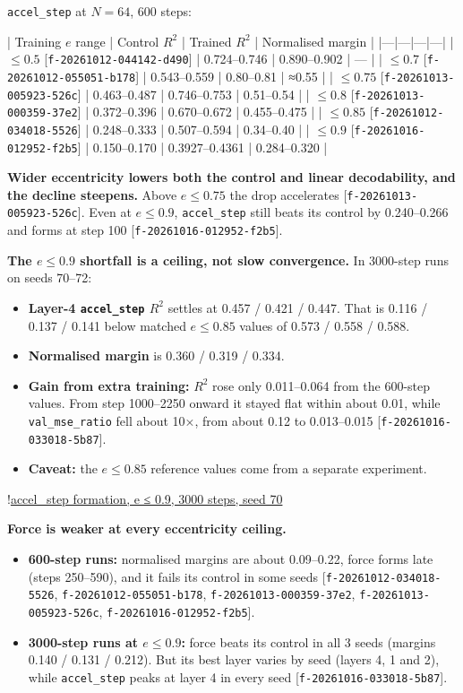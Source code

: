 \documentclass{article}
\begin{document}
\texttt{accel\_step} at $N = 64$, 600 steps:

| Training $e$ range | Control $R^2$ | Trained $R^2$ | Normalised margin |
|---|---|---|---|
| $\le 0.5$ [\texttt{f-20261012-044142-d490}] | 0.724–0.746 | 0.890–0.902 | — |
| $\le 0.7$ [\texttt{f-20261012-055051-b178}] | 0.543–0.559 | 0.80–0.81 | ≈0.55 |
| $\le 0.75$ [\texttt{f-20261013-005923-526c}] | 0.463–0.487 | 0.746–0.753 | 0.51–0.54 |
| $\le 0.8$ [\texttt{f-20261013-000359-37e2}] | 0.372–0.396 | 0.670–0.672 | 0.455–0.475 |
| $\le 0.85$ [\texttt{f-20261012-034018-5526}] | 0.248–0.333 | 0.507–0.594 | 0.34–0.40 |
| $\le 0.9$ [\texttt{f-20261016-012952-f2b5}] | 0.150–0.170 | 0.3927–0.4361 | 0.284–0.320 |

\textbf{Wider eccentricity lowers both the control and linear decodability, and the decline steepens.} Above $e \le 0.75$ the drop accelerates [\texttt{f-20261013-005923-526c}]. Even at $e \le 0.9$, \texttt{accel\_step} still beats its control by 0.240–0.266 and forms at step 100 [\texttt{f-20261016-012952-f2b5}].

\textbf{The $e \le 0.9$ shortfall is a ceiling, not slow convergence.} In 3000-step runs on seeds 70–72:

\begin{itemize}
\item \textbf{Layer-4 \texttt{accel\_step} $R^2$} settles at 0.457 / 0.421 / 0.447. That is 0.116 / 0.137 / 0.141 below matched $e \le 0.85$ values of 0.573 / 0.558 / 0.588.
\item \textbf{Normalised margin} is 0.360 / 0.319 / 0.334.
\item \textbf{Gain from extra training:} $R^2$ rose only 0.011–0.064 from the 600-step values. From step 1000–2250 onward it stayed flat within about 0.01, while \texttt{val\_mse\_ratio} fell about 10×, from about 0.12 to 0.013–0.015 [\texttt{f-20261016-033018-5b87}].
\item \textbf{Caveat:} the $e \le 0.85$ reference values come from a separate experiment.
\end{itemize}

!\href{figure:formation/run-20261016-030349-a5e9}{accel\_step formation, e ≤ 0.9, 3000 steps, seed 70}

\textbf{Force is weaker at every eccentricity ceiling.}

\begin{itemize}
\item \textbf{600-step runs:} normalised margins are about 0.09–0.22, force forms late (steps 250–590), and it fails its control in some seeds [\texttt{f-20261012-034018-5526}, \texttt{f-20261012-055051-b178}, \texttt{f-20261013-000359-37e2}, \texttt{f-20261013-005923-526c}, \texttt{f-20261016-012952-f2b5}].
\item \textbf{3000-step runs at $e \le 0.9$:} force beats its control in all 3 seeds (margins 0.140 / 0.131 / 0.212). But its best layer varies by seed (layers 4, 1 and 2), while \texttt{accel\_step} peaks at layer 4 in every seed [\texttt{f-20261016-033018-5b87}].
\end{itemize}
\end{document}
